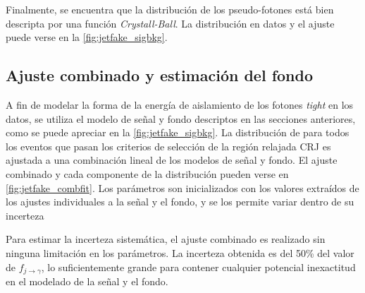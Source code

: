 Finalmente, se encuentra que la distribución de los pseudo-fotones está bien
descripta por una función \emph{Crystall-Ball}. La
distribución en datos y el ajuste puede verse en la \cref{fig:jetfake_sigbkg}.




\subsection{Ajuste combinado y estimación del fondo} \label{sec:jet_fake_results}


A fin de modelar la forma de la energía de aislamiento de los fotones
\emph{tight} en los datos, se utiliza el modelo de señal y fondo descriptos en
las secciones anteriores, como se puede apreciar en la
\cref{fig:jetfake_sigbkg}. La distribución de {\etiso} para todos los eventos
que pasan los criterios de selección de la región relajada CRJ es ajustada a una
combinación lineal de los modelos de señal y fondo. El ajuste combinado y cada
componente de la distribución pueden verse en \cref{fig:jetfake_combfit}. Los
parámetros son inicializados con los valores extraídos de los ajustes
individuales a la señal y el fondo, y se los permite variar dentro de su
incerteza


Para estimar la incerteza sistemática, el ajuste combinado es realizado
sin ninguna limitación en los parámetros. La incerteza obtenida es del
50\% del valor de $f_{j\to\gamma}$, lo suficientemente grande para contener
cualquier potencial inexactitud en el modelado de la señal y el fondo.

